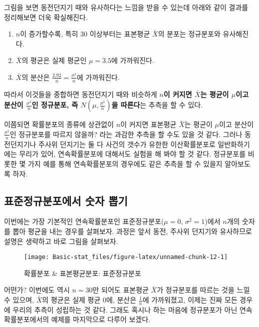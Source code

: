 \documentclass[]{book}
\providecommand{\tightlist}{%
  \setlength{\itemsep}{0pt}\setlength{\parskip}{0pt}}
\begin{document}
그림을 보면 동전던지기 때와 유사하다는 느낌을 받을 수 있는데 아래와 같이
결과를 정리해보면 더욱 확실해진다.

\begin{enumerate}
\def\labelenumi{\arabic{enumi}.}
\tightlist
\item
  \(n\)이 증가할수록, 특히 30 이상부터는 표본평균 \(\bar{X}\)의 분포는
  정규분포와 유사해진다.
\item
  \(\bar{X}\)의 평균은 실제 평균인 \(\mu=3.5\)에 가까워진다.
\item
  \(\bar{X}\)의 분산은 \(\frac{2.92}{n}=\frac{\sigma^2}{n}\)에
  가까워진다.
\end{enumerate}

따라서 이것들을 종합하면 동전던지기 때와 비슷하게 \textbf{\(n\)이 커지면
\(\bar{X}\)는 평균이 \(\mu\)이고 분산이 \(\frac{\sigma^2}{n}\)인
정규분포, 즉 \(N(\mu,\frac{\sigma^2}{n})\)을 따른다}는 추측을 할 수
있다.

이쯤되면 확률분포의 종류에 상관없이 \(n\)이 커지면 표본평균
\(\bar{X}\)는 평균이 \(\mu\)이고 분산이 \(\frac{\sigma^2}{n}\)인
정규분포를 따르지 않을까? 라는 과감한 추측을 할 수도 있을 것 같다.
그러나 동전던지기나 주사위 던지기는 둘 다 사건의 갯수가 유한한
이산확률분포로 일반화하기에는 무리가 있어, 연속확률분포에 대해서도
실험을 해 봐야 할 것 같다. 정규분포를 비롯한 몇 가지 예를 통해
연속확률분포의 경우에도 같은 추측을 할 수 있을지 알아보도록 하자.

\subsection{표준정규분포에서 숫자
뽑기}\label{uxd45cuxc900uxc815uxaddcuxbd84uxd3ecuxc5d0uxc11c-uxc22buxc790-uxbf51uxae30}

이번에는 가장 기본적인 연속확률분포인 표준정규분포(\(\mu=0\),
\(\sigma^2=1\))에서 \(n\)개의 숫자를 뽑아 평균을 내는 경우를 살펴보자.
과정은 앞서 동전, 주사위 던지기와 유사하므로 설명은 생략하고 바로 그림을
살펴보자.

\begin{figure}

{\centering \texttt{[image: Basic-stat\_files/figure-latex/unnamed-chunk-12-1]} 

}

\caption{확률분포 \& 표본평균분포: 표준정규분포}\label{fig:unnamed-chunk-12}
\end{figure}

어떤가? 이번에도 역시 \(n=30\)만 되어도 표본평균 \(\bar{X}\)가
정규분포를 따르는 것을 느낄 수 있으며, \(\bar{X}\)의 평균은 실제 평균
0에, 분산은 \(\frac{1}{n}\)에 가까워졌고, 이제는 진짜 모든 경우에 우리의
추측이 성립하는 것 같다. 그래도 혹시나 하는 마음에 정규분포가 아닌
연속확률분포에서의 예제를 마지막으로 다루어 보겠다.
\end{document}
